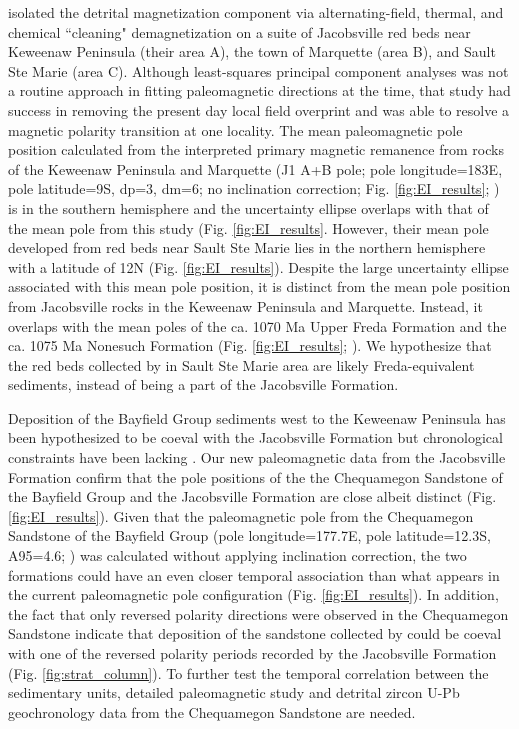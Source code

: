\documentclass[draft]{agujournal2019}
\begin{document}
 isolated the detrital magnetization component via alternating-field, thermal, and chemical ``cleaning" demagnetization on a suite of Jacobsville red beds near Keweenaw Peninsula (their area A), the town of Marquette (area B), and Sault Ste Marie (area C). Although least-squares principal component analyses was not a routine approach in fitting paleomagnetic directions at the time, that study had success in removing the present day local field overprint and was able to resolve a magnetic polarity transition at one locality. The mean paleomagnetic pole position calculated from the interpreted primary magnetic remanence from rocks of the Keweenaw Peninsula and Marquette (J1 A+B pole; pole longitude=183\textdegree E, pole latitude=9\textdegree S, dp=3\textdegree, dm=6\textdegree; no inclination correction; Fig. \ref{fig:EI_results}; ) is in the southern hemisphere and the uncertainty ellipse overlaps with that of the mean pole from this study (Fig. \ref{fig:EI_results}. However, their mean pole developed from red beds near Sault Ste Marie lies in the northern hemisphere with a latitude of 12\textdegree N (Fig. \ref{fig:EI_results}). Despite the large uncertainty ellipse associated with this mean pole position, it is distinct from the mean pole position from Jacobsville rocks in the Keweenaw Peninsula and Marquette. Instead, it overlaps with the mean poles of the ca. 1070 Ma Upper Freda Formation and the ca. 1075 Ma Nonesuch Formation (Fig. \ref{fig:EI_results}; ). We hypothesize that the red beds collected by  in Sault Ste Marie area are likely Freda-equivalent sediments, instead of being a part of the Jacobsville Formation. 

Deposition of the Bayfield Group sediments west to the Keweenaw Peninsula has been hypothesized to be coeval with the Jacobsville Formation but chronological constraints have been lacking \cite{Hamblin1958a, Kalliokoski1982a, Malone2016a}. Our new paleomagnetic data from the Jacobsville Formation confirm that the pole positions of the the Chequamegon Sandstone of the Bayfield Group and the Jacobsville Formation are close albeit distinct (Fig. \ref{fig:EI_results}). Given that the paleomagnetic pole from the Chequamegon Sandstone of the Bayfield Group (pole longitude=177.7\textdegree E, pole latitude=12.3\textdegree S, A95=4.6\textdegree; ) was calculated without applying inclination correction, the two formations could have an even closer temporal association than what appears in the current paleomagnetic pole configuration (Fig. \ref{fig:EI_results}). In addition, the fact that only reversed polarity directions were observed in the Chequamegon Sandstone indicate that deposition of the sandstone collected by  could be coeval with one of the reversed polarity periods recorded by the Jacobsville Formation (Fig. \ref{fig:strat_column}). To further test the temporal correlation between the sedimentary units, detailed paleomagnetic study and detrital zircon U-Pb geochronology data from the Chequamegon Sandstone are needed. 
\end{document}
